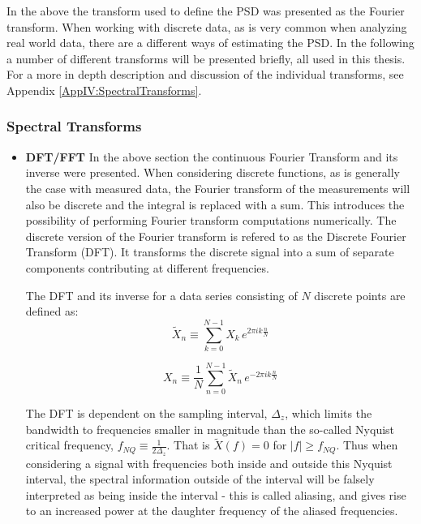 \documentclass[../../CompleteThesis2/Complete_2ndDraft]{subfiles}
\begin{document}
In the above the transform used to define the PSD was presented as the Fourier transform. When working with discrete data, as is very common when analyzing real world data, there are a different ways of estimating the PSD. In the following a number of different transforms will be presented briefly, all used in this thesis. For a more in depth description and discussion of the individual transforms, see Appendix \ref{AppIV:SpectralTransforms}.


\subsubsection[Spectral Transforms][Spectral Transforms]{Spectral Transforms}
\label{Subsubsec:SignalAnalysis_BackDiffusion_SpectralAnalysis_SpectralTransforms}

\begin{itemize}
	\item \textbf{DFT/FFT} In the above section the continuous Fourier Transform and its inverse were presented. When considering discrete functions, as is generally the case with measured data, the Fourier transform of the measurements will also be discrete and the integral is replaced with a sum. This introduces the possibility of performing Fourier transform computations numerically. The discrete version of the Fourier transform is refered to as the Discrete Fourier Transform (DFT). It transforms the discrete signal into a sum of separate components contributing at different frequencies.
	
	The DFT and its inverse for a data series consisting of $N$ discrete points are defined as:
	\begin{equation}
		\tilde{X}_n\equiv \sum_{k=0}^{N-1}X_k \, e^{2\pi i k \frac{n}{N}}
	\end{equation}

	\begin{equation}
		X_n\equiv \frac{1}{N} \sum_{n=0}^{N-1}\tilde{X}_n \, e^{-2\pi i k \frac{n}{N}}
	\end{equation}

	The DFT is dependent on the sampling interval, $\Delta_z$, which limits the bandwidth to frequencies smaller in magnitude than the so-called Nyquist critical frequency, $f_{NQ}\equiv\frac{1}{2\Delta_z}$. That is $\tilde{X}(f)=0$ for $|f|\geq f_{NQ}$. Thus when considering a signal with frequencies both inside and outside this Nyquist interval, the spectral information outside of the interval will be falsely interpreted as being inside the interval - this is called aliasing, and gives rise to an increased power at the daughter frequency of the aliased frequencies.
	

\end{itemize}
\end{document}
